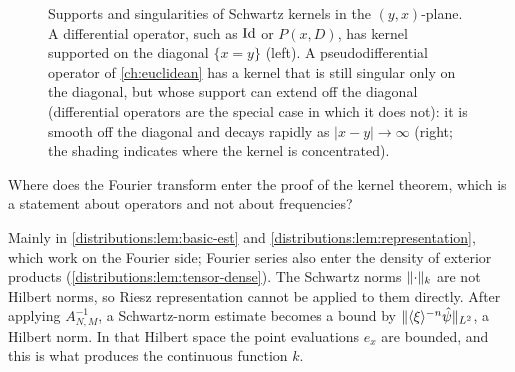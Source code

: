 \begin{figure}[htbp]
\centering
{}
\caption{Supports and singularities of Schwartz kernels in the $(y,x)$-plane. A
differential operator, such as $\operatorname{Id}$ or $P(x,D)$, has kernel supported on the diagonal
$\{x=y\}$ (left). A pseudodifferential operator of \cref{ch:euclidean} has a kernel that
is still singular only on the diagonal, but whose support can extend off the diagonal
(differential operators are the special case in which it does not): it is smooth
off the diagonal and decays rapidly as $|x-y|\to\infty$ (right; the shading indicates
where the kernel is concentrated).}
\label{distributions:fig:kernels}
\end{figure}

\begin{question}
Where does the Fourier transform enter the proof of the kernel theorem, which is a
statement about operators and not about frequencies?
\end{question}
\begin{answer}
Mainly in \cref{distributions:lem:basic-est} and
\cref{distributions:lem:representation}, which work on the Fourier side; Fourier
series also enter the density of exterior products
(\cref{distributions:lem:tensor-dense}). The Schwartz norms $\lVert \cdot\rVert_k$ are not
Hilbert norms, so Riesz representation cannot be applied to them directly. After
applying $A_{N,M}^{-1}$, a Schwartz-norm estimate becomes a bound by
$\lVert \langle \xi\rangle^{-n}\hat\psi\rVert_{L^2}$, a Hilbert norm. In that Hilbert space the point
evaluations $e_x$ are bounded, and this is what produces the continuous function $k$.
\end{answer}

